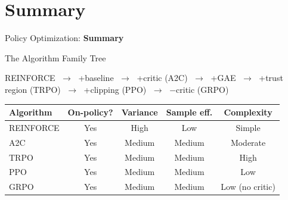 \section{Summary}
\begin{frame}{}
    \LARGE Policy Optimization: \textbf{Summary}
\end{frame}

\begin{frame}{The Algorithm Family Tree}
\begin{center}
REINFORCE $\;\rightarrow\;$ +baseline $\;\rightarrow\;$ +critic (A2C) $\;\rightarrow\;$ +GAE $\;\rightarrow\;$ +trust region (TRPO) $\;\rightarrow\;$ +clipping (PPO) $\;\rightarrow\;$ $-$critic (GRPO)
\end{center}

\vspace{0.5em}

\begin{table}[]
    \centering
    \renewcommand{\arraystretch}{1.8}
    \small
    \begin{tabular}{lcccc}
        \hline
        \textbf{Algorithm} & \textbf{On-policy?} & \textbf{Variance} & \textbf{Sample eff.} & \textbf{Complexity} \\
        \hline
        REINFORCE        & Yes & High   & Low    & Simple \\
        A2C              & Yes & Medium & Medium & Moderate \\
        TRPO             & Yes & Medium & Medium & High \\
        PPO              & Yes & Medium & Medium & Low \\
        GRPO             & Yes & Medium & Medium & Low (no critic) \\
        \hline
    \end{tabular}
\end{table}
\end{frame}

